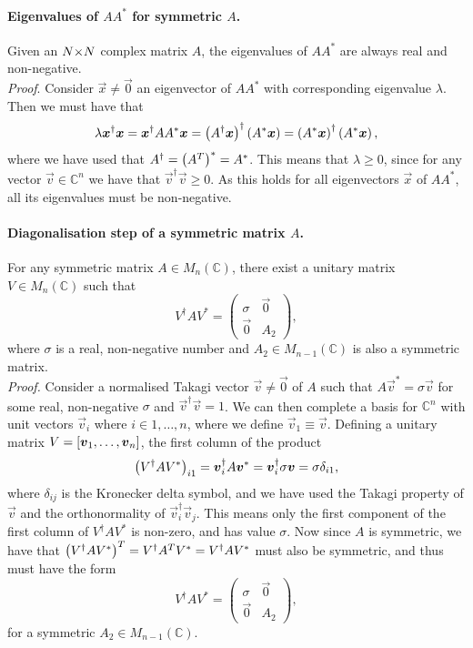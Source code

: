 \documentclass[english, notitlepage]{article}
\begin{document}
    \paragraph{Eigenvalues of \(AA^\ast\) for symmetric \(A\).}
    Given an \(N {\times} N\) complex matrix \(A\), the eigenvalues of \(AA^\ast\) are always real and non-negative.\\
    \emph{Proof}.
    Consider \(\vec{x} \neq \vec{0}\) an eigenvector of \(AA^\ast\) with corresponding eigenvalue \(\lambda\).
    Then we must have that
    \[\lambda \boldsymbol{x}^\dagger \boldsymbol{x} = \boldsymbol{x}^\dagger AA^\ast \boldsymbol{x} = \left(A^\dagger \boldsymbol{x}\right)^\dagger \left(A^\ast \boldsymbol{x}\right) = \left(A^\ast \boldsymbol{x}\right)^\dagger \left(A^\ast \boldsymbol{x}\right),\]
    where we have used that \(A^\dagger = \left(A^T\right)^\ast = A^\ast\).
    This means that \(\lambda \geq 0\), since for any vector \(\vec{v} \in \mathbb{C}^n\) we have that \(\vec{v}^\dagger \vec{v} \geq 0\).
    As this holds for all eigenvectors \(\vec{x}\) of \(AA^\ast\), all its eigenvalues must be non-negative.

    \paragraph{Diagonalisation step of a symmetric matrix \(A\).}
    For any symmetric matrix \(A \in M_n(\mathbb{C})\), there exist a unitary matrix \(V \in M_n(\mathbb{C})\) such that
    \[V^\dagger A V^\ast = \begin{pmatrix} \sigma & \vec{0} \\ \vec{0} & A_2 \end{pmatrix},\]
    where \(\sigma\) is a real, non-negative number and \(A_2 \in M_{n-1}(\mathbb{C})\) is also a symmetric matrix. \\
    \emph{Proof.}
    Consider a normalised Takagi vector \(\vec{v} \neq \vec{0}\) of \(A\) such that \(A\vec{v}^\ast = \sigma \vec{v}\) for some real, non-negative \(\sigma\) and \(\vec{v}^\dagger \vec{v} = 1\).
    We can then complete a basis for \(\mathbb{C}^n\) with unit vectors \(\vec{v}_i\) where \(i \in 1, \ldots, n\), where we define \(\vec{v}_1 \equiv \vec{v}\).
    Defining a unitary matrix \(V = \left[\boldsymbol{v}_1, \ldots, \boldsymbol{v}_{n}\right]\), the first column of the product
    \[\left(V^\dagger A V^\ast\right)_{i1} = \boldsymbol{v}_i^\dagger A \boldsymbol{v}^* = \boldsymbol{v}_i^\dagger \sigma \boldsymbol{v} = \sigma \delta_{i1},\]
    where \(\delta_{ij}\) is the Kronecker delta symbol, and we have used the Takagi property of \(\vec{v}\) and the orthonormality of \(\vec{v}_i^\dagger \vec{v}_j\).
    This means only the first component of the first column of \(V^\dagger A V^\ast\) is non-zero, and has value \(\sigma\).
    Now since \(A\) is symmetric, we have that
    \(\left(V^\dagger A V^\ast\right)^T = V^\dagger A^T V^\ast = V^\dagger A V^\ast\)
    must also be symmetric, and thus must have the form
    \[V^\dagger A V^\ast = \begin{pmatrix} \sigma & \vec{0} \\ \vec{0} & A_2 \end{pmatrix},\]
    for a symmetric \(A_2 \in M_{n-1}(\mathbb{C})\).


    \printbibliography
\end{document}
